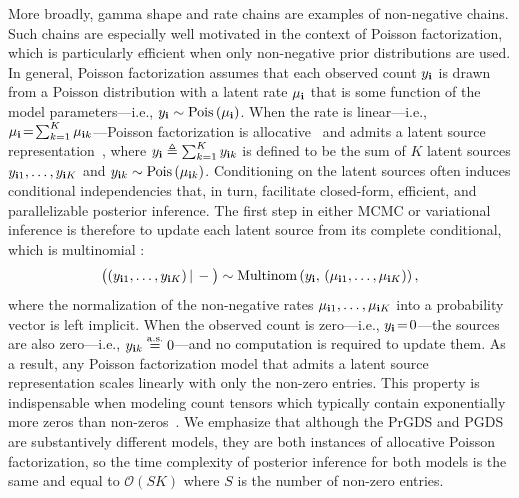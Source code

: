 \documentclass{article}
\begin{document}
More broadly, gamma shape and rate chains are examples of non-negative chains. Such chains are especially well motivated in the context of Poisson factorization, which is particularly efficient when only non-negative prior distributions are used. In general, Poisson factorization assumes that each observed count $y_{\textbf{\textrm{i}}}$ is drawn from a Poisson distribution with a latent rate $\mu_{\textbf{\textrm{i}}}$ that is some function of the model parameters---i.e., $y_{\textbf{\textrm{i}}} \sim \textrm{Pois}\left( \mu_{\textbf{\textrm{i}}} \right)$. When the rate is linear---i.e., $\mu_{\textbf{\textrm{i}}} \!=\! \sum_{k=1}^K \mu_{\textbf{\textrm{i}} k}$---Poisson factorization is allocative~\citep{schein2019allocative} and admits a latent source representation~\cite{Dunson2005bayesianlatent,cemgil2009bayesian}, where $y_{\textbf{\textrm{i}}} \triangleq \sum_{k=1}^K y_{\textbf{\textrm{i}} k}$ is defined to be the sum of $K$ latent sources $y_{\textbf{\textrm{i}} 1}, \ldots, y_{\textbf{\textrm{i}} K}$ and $y_{\textbf{\textrm{i}} k} \sim \textrm{Pois}\left( \mu_{\textbf{\textrm{i}} k} \right)$. Conditioning on the latent sources often induces conditional independencies that, in turn, facilitate closed-form, efficient, and parallelizable posterior inference. The first step in either MCMC or variational inference is therefore to update each latent source from its complete conditional, which is multinomial \cite{steel1953relation}:~
\begin{equation}
\label{eq:thinning}
\big((y_{\textbf{\textrm{i}}1},\dots,y_{\textbf{\textrm{i}} K})\,|\,-\big) \sim \textrm{Multinom}\left( y_{\textbf{\textrm{i}}},\, (\mu_{\textbf{\textrm{i}} 1},\dots, \mu_{\textbf{\textrm{i}} K}) \right),
\end{equation}
where the normalization of the non-negative rates $\mu_{\textbf{\textrm{i}} 1}, \ldots, \mu_{\textbf{\textrm{i}} K}$ into a probability vector is left implicit. When the observed count is zero---i.e., $y_{\textbf{\textrm{i}}} \!=\! 0$---the sources are also zero---i.e., $y_{\textbf{\textrm{i}} k} \stackrel{\textrm{a.s.}}{=}0$---and no computation is required to update them. As a result, any Poisson factorization model that admits a latent source representation scales linearly with only the non-zero entries. This property is indispensable when modeling count tensors which typically contain exponentially more zeros than non-zeros~\cite{bhattacharya2012simplex}. We emphasize that although the PrGDS and PGDS are substantively different models, they are both instances of allocative Poisson factorization, so the time complexity of posterior inference for both models is the same and equal to $\mathcal{O}\left(SK\right)$ where $S$ is the number of non-zero entries.~
\end{document}
